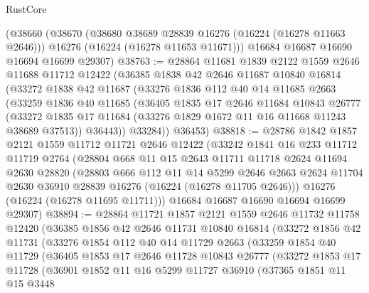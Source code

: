 \begin{lexlean}{RustCore}
\begin{coremodule}
    (@38660
      (@38670
        (@38680 @38689 @28839 @16276 (@16224 (@16278 @11663 @2646)))
        @16276
        (@16224 (@16278 @11653 @11671)))
      @16684
      @16687
      @16690
      @16694
      @16699
      @29307)
@38763 := @28864
    @11681
    @1839
    @2122
    @1559
    @2646
    @11688
    @11712
    @12422
    (@36385
      @1838
      @42
      @2646
      @11687
      @10840
      @16814
      (@33272
        @1838
        @42
        @11687
        (@33276
          @1836
          @112
          @40
          @14
          @11685
          @2663
          (@33259
            @1836
            @40
            @11685
            (@36405
              @1835
              @17
              @2646
              @11684
              @10843
              @26777
              (@33272 @1835 @17 @11684 (@33276 @1829 @1672 @11 @16 @11668 @11243 @38689 @37513))
              @36443))
          @33284))
      @36453)
@38818 := @28786
    @1842
    @1857
    @2121
    @1559
    @11712
    @11721
    @2646
    @12422
    (@33242
      @1841
      @16
      @233
      @11712
      @11719
      @2764
      (@28804
        @668
        @11
        @15
        @2643
        @11711
        @11718
        @2624
        @11694
        @2630
        @28820
        (@28803
          @666
          @112
          @11
          @14
          @5299
          @2646
          @2663
          @2624
          @11704
          @2630
          @36910
          @28839
          @16276
          (@16224 (@16278 @11705 @2646)))
        @16276
        (@16224 (@16278 @11695 @11711)))
      @16684
      @16687
      @16690
      @16694
      @16699
      @29307)
@38894 := @28864
    @11721
    @1857
    @2121
    @1559
    @2646
    @11732
    @11758
    @12420
    (@36385
      @1856
      @42
      @2646
      @11731
      @10840
      @16814
      (@33272
        @1856
        @42
        @11731
        (@33276
          @1854
          @112
          @40
          @14
          @11729
          @2663
          (@33259
            @1854
            @40
            @11729
            (@36405
              @1853
              @17
              @2646
              @11728
              @10843
              @26777
              (@33272
                @1853
                @17
                @11728
                (@36901
                  @1852
                  @11
                  @16
                  @5299
                  @11727
                  @36910
                  (@37365
                    @1851
                    @11
                    @15
                    @3448

\end{coremodule}
\end{lexlean}
